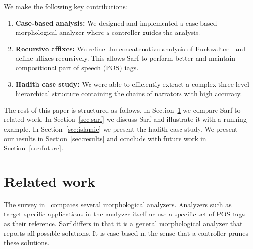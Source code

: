 \documentclass[11pt]{article}
\begin{document}
We make the following key contributions: 
\begin{enumerate}
\item {\bf Case-based analysis:}  We designed and implemented
a case-based morphological analyzer where a controller
guides the analysis. 
\item {\bf Recursive affixes:}
We refine the concatenative analysis of 
Buckwalter~ and define affixes
recursively. 
This allows Sarf to perform better and 
maintain compositional part of speech (POS) tags.
\item {\bf Hadith case study:}
We were able to efficiently extract a complex three 
level hierarchical 
structure containing the chains of narrators 
with high accuracy. 
\end{enumerate}


The rest of this paper is structured as follows. In Section~\ref{sec:related}
we compare Sarf to related work. In Section~\ref{sec:sarf}
we discuss Sarf and illustrate it with a running example.
In Section~\ref{sec:islamic} we present the hadith case
study. We present our results in Section~\ref{sec:results}
and conclude with future work in Section~\ref{sec:future}.


\section{Related work }
\label{sec:related}

The survey in~\cite{Sughaiyer:04} compares
several morphological analyzers. 
Analyzers such as~\cite{Khoja:01,Darwish:02} 
target specific applications in the 
analyzer itself or use a specific set of POS tags
as their reference.
Sarf differs in that it is a general morphological 
analyzer that reports all possible solutions. 
It is case-based in the sense that a controller 
prunes these solutions. 
\end{document}
